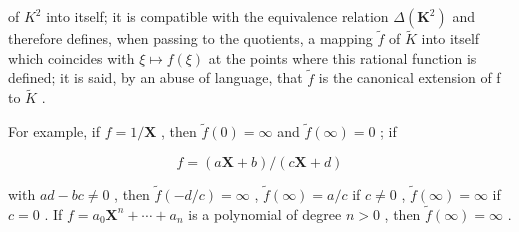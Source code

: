 of \(K^{2}\) into itself; it is compatible with the equivalence relation \(\Delta(\mathbf{K}^{2})\) and therefore defines, when passing to the quotients, a mapping \(\tilde{f}\) of \(\tilde{K}\) into itself which coincides with \(\xi\mapsto f(\xi)\) at the points where this rational function is defined; it is said, by an abuse of language, that \(\tilde{f}\) is the canonical extension of f to \(\tilde{K}\) .

For example, if \(f = 1 / \mathbf{X}\) , then \(\tilde{f}(0) = \infty\) and \(\tilde{f}(\infty) = 0\) ; if

\[
f = (a \mathbf {X} + b) / (c \mathbf {X} + d)
\]

with \(ad - bc \neq 0\) , then \(\tilde{f}(-d/c) = \infty\) , \(\tilde{f}(\infty) = a/c\) if \(c \neq 0\) , \(\tilde{f}(\infty) = \infty\) if \(c = 0\) . If \(f = a_0\mathbf{X}^n + \cdots + a_n\) is a polynomial of degree \(n > 0\) , then \(\tilde{f}(\infty) = \infty\) .

